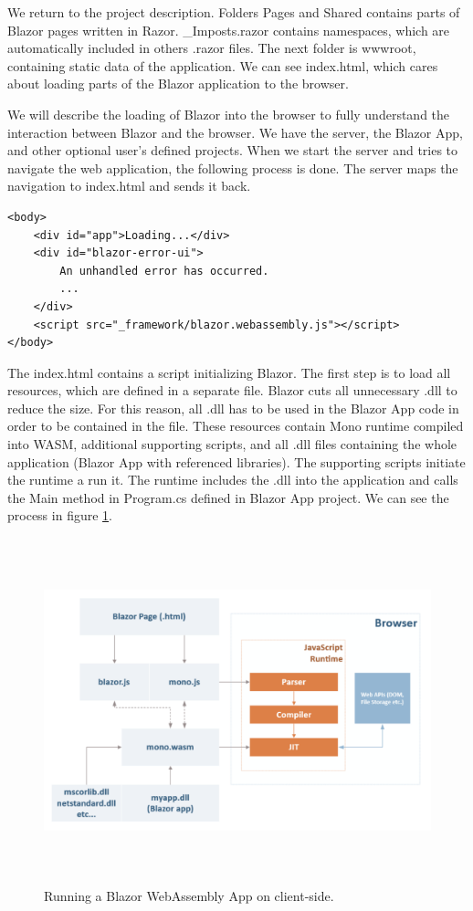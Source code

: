 We return to the project description. 
Folders Pages and Shared contains parts of Blazor pages written in Razor.
\_Imposts.razor contains namespaces, which are automatically included in others .razor files.
The next folder is wwwroot, containing static data of the application.
We can see index.html, which cares about loading parts of the Blazor application to the browser.
\par
We will describe the loading of Blazor into the browser to fully understand the interaction between Blazor and the browser.
We have the server, the Blazor App, and other optional user's defined projects. 
When we start the server and tries to navigate the web application, the following process is done.
The server maps the navigation to index.html and sends it back.
\par
\begin{minipage}[c]{0.95\textwidth}
\begin{lstlisting}[basicstyle=\small, caption=A Javascript code., label={lst:Javascript}]
<body>
    <div id="app">Loading...</div>
    <div id="blazor-error-ui">
        An unhandled error has occurred.
		...
    </div>
    <script src="_framework/blazor.webassembly.js"></script>
</body>

\end{lstlisting}
\end{minipage}
\par 
The index.html contains a script initializing Blazor.
The first step is to load all resources, which are defined in a separate file.
Blazor cuts all unnecessary .dll to reduce the size.
For this reason, all .dll has to be used in the Blazor App code in order to be contained in the file. 
These resources contain Mono runtime compiled into WASM, additional supporting scripts, and all .dll files containing the whole application (Blazor App with referenced libraries).
The supporting scripts initiate the runtime a run it.
The runtime includes the .dll into the application and calls the Main method in Program.cs defined in Blazor App project.
We can see the process in figure \ref{img02:wasm}.
\par
\begin{figure}[H]\centering
\includegraphics[width=140mm, height=100mm]{./img/BlazorExecution}
\caption{Running a Blazor WebAssembly App on client-side.}
\label{img02:wasm}
\end{figure}
